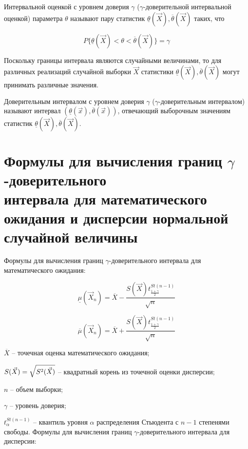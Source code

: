 \documentclass[12pt]{report}
\begin{document}
Интервальной оценкой с уровнем доверия $\gamma$ ($\gamma$-доверительной интервальной оценкой) параметра $\theta$ называют пару статистик $\underline{\theta}(\vec X), \overline{\theta}(\vec X)$ таких, что

\begin{equation*}
	P\{\underline{\theta}(\vec X)<\theta<\overline{\theta}(\vec X)\}=\gamma
\end{equation*}

Поскольку границы интервала являются случайными величинами, то для различных реализаций случайной выборки $\vec X$ статистики $\underline{\theta}(\vec X), \overline{\theta}(\vec X)$ могут принимать различные значения.

Доверительным интервалом с уровнем доверия $\gamma$ ($\gamma$-доверительным интервалом) называют интервал $(\underline{\theta}(\vec x), \overline{\theta}(\vec x))$, отвечающий выборочным значениям статистик $\underline{\theta}(\vec X), \overline{\theta}(\vec X)$.

\section*{Формулы для вычисления границ $\gamma$-доверительного \\ интервала для математического ожидания и дисперсии нормальной случайной величины}

Формулы для вычисления границ $\gamma$-доверительного интервала для математического ожидания:

\begin{equation}
\underline\mu(\vec X_n)=\overline X - \frac{S(\vec X)t^{St(n-1)}_{\frac{1+\gamma}{2}}}{\sqrt{n}}
\end{equation}

\begin{equation}
\overline\mu(\vec X_n)=\overline X + \frac{S(\vec X)t^{St(n-1)}_{\frac{1+\gamma}{2}}}{\sqrt{n}}
\end{equation}

$\overline X$ -- точечная оценка математического ожидания;

$S(\vec X) = \sqrtsign{S^2(\vec X)}$ -- квадратный корень из точечной оценки дисперсии;

$n$ -- объем выборки;

$\gamma$ -- уровень доверия;

$t^{St(n-1)}_{\alpha}$ -- квантиль уровня $\alpha$ распределения Стьюдента с $n - 1$ степенями свободы.
\newpage
Формулы для вычисления границ $\gamma$-доверительного интервала для дисперсии:
\end{document}
